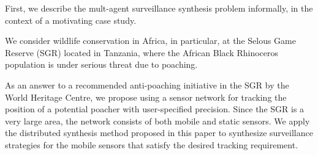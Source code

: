 First, we describe the mult-agent surveillance synthesis problem informally, in the context of a motivating case study. 

We consider wildlife conservation in Africa, in particular, at the Selous Game Reserve (SGR) located in Tanzania, where the African Black Rhinoceros population is under serious threat due to poaching. 

As an answer to a recommended anti-poaching initiative in the SGR by the World Heritage Centre,  we propose using a sensor network for tracking the position of a potential poacher  with user-specified precision. Since the SGR is a very large area, the network consists of both mobile and static sensors. We apply the  distributed synthesis method proposed in this paper to synthesize surveillance strategies for the mobile sensors that satisfy the desired tracking requirement.


